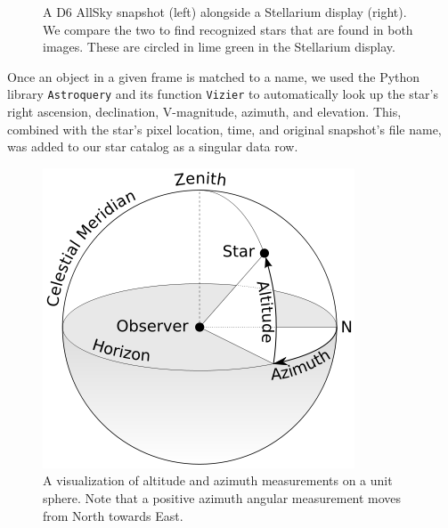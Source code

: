 \begin{figure}[h]
  \caption{A D6 AllSky snapshot (left) alongside a Stellarium display (right).  We compare the two to find recognized stars that are found in both images.  These are circled in lime green in the Stellarium display. }
  \label{star_recognition}
\end{figure}


Once an object in a given frame is matched to a name, we used the Python library \texttt{Astroquery} and its function \texttt{Vizier} to automatically look up the star's right ascension, declination, V-magnitude, azimuth, and elevation.  
This, combined with the star's pixel location, time, and original snapshot's file name, was added to our star catalog as a singular data row.

\begin{figure}[h]
  \centering
  \includegraphics[scale=0.4]{images/az_el.png}
  \caption{A visualization of altitude and azimuth measurements on a unit sphere.  Note that a positive azimuth angular measurement moves from North towards East.}
  \label{altaz}
\end{figure}

